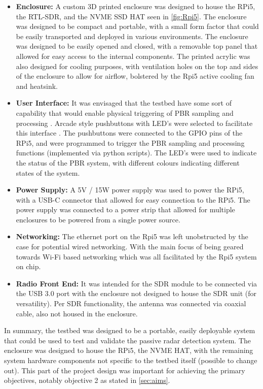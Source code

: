 \begin{itemize}
    \item \textbf{Enclosure:} A custom 3D printed enclosure was designed to house the RPi5, the RTL-SDR, and the NVME SSD HAT seen in \ref{fig:Rpi5}. The enclosure was designed to be compact and portable, with a small form factor that could be easily transported and deployed in various environments. The enclosure was designed to be easily opened and closed, with a removable top panel that allowed for easy access to the internal components. The printed acrylic was also designed for cooling purposes, with ventilation holes on the top and sides of the enclosure to allow for airflow, bolstered by the Rpi5 active cooling fan and heatsink.
    \item \textbf{User Interface:} It was envisaged that the testbed have some sort of capability that would enable physical triggering of PBR sampling and processing . Arcade style pushbuttons with LED's were selected to facilitate this interface \cite{pushbuttons}. The pushbuttons were connected to the GPIO pins of the RPi5, and were programmed to trigger the PBR sampling and processing functions (implemented via python scripts). The LED's were used to indicate the status of the PBR system, with different colours indicating different states of the system.
    \item \textbf{Power Supply:} A 5V / 15W power supply was used to power the RPi5, with a USB-C connector that allowed for easy connection to the RPi5. The power supply was connected to a power strip that allowed for multiple enclosures to be powered from a single power source.
    \item \textbf{Networking:} The ethernet port on the Rpi5 was left unobstructed by the case for potential wired networking. With the main focus of being geared towards Wi-Fi based networking which was all facilitated by the Rpi5 system on chip.
    \item \textbf{Radio Front End:} It was intended for the SDR module to be connected via the USB 3.0 port with the enclosure not designed to house the SDR unit (for versatility). Per SDR functionality, the antenna was connected via coaxial cable, also not housed in the enclosure. 
    
\end{itemize}

In summary, the testbed was designed to be a portable, easily deployable system that could be used to test and validate the passive radar detection system. The enclosure was designed to house the RPi5, the NVME HAT, with the remaining system hardware components not specific to the testbed itself (possible to change out). This part of the project design was important for achieving the primary objectives, notably objective 2 as stated in \ref{sec:aims}.

